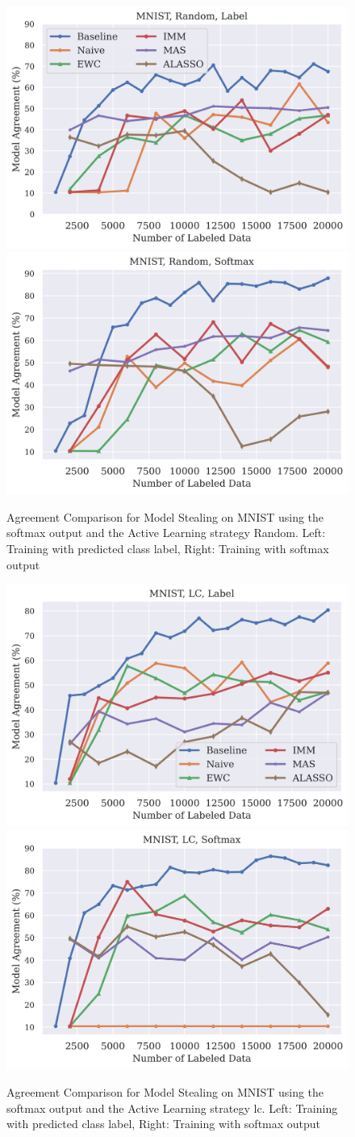 \begin{figure}[!htb]
    \centering
    \includegraphics[width=0.48\linewidth]{images/results_CALMS/mnist_label_random.png} \hfill
    \includegraphics[width=0.48\linewidth]{images/results_CALMS/mnist_softmax_random.png}
    \caption{Agreement Comparison for Model Stealing on MNIST using the softmax output and the Active Learning strategy Random. Left: Training with predicted class label,
    Right: Training with softmax output}
    \label{fig:CALMSMNISTRandom}
\end{figure}

\begin{figure}[!htb]
    \centering
    \includegraphics[width=0.48\linewidth]{images/results_CALMS/mnist_label_lc.png} \hfill
    \includegraphics[width=0.48\linewidth]{images/results_CALMS/mnist_softmax_lc.png}
    \caption{Agreement Comparison for Model Stealing on MNIST using the softmax output and the Active Learning strategy \gls{lc}. Left: Training with predicted class label,
    Right: Training with softmax output}
    \label{fig:CALMSMNISTLC}
\end{figure}

